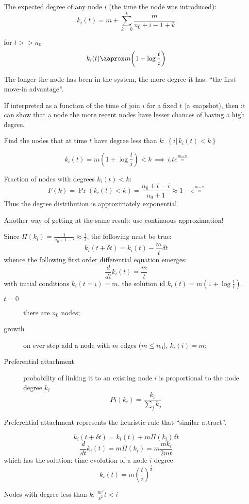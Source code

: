 \documentclass[a4paper]{article}
\newcommand{\obj}[1]{{\left\{ #1 \right \}}}
\newcommand{\brac}[1]{{\left ( #1 \right )}}
\newcommand{\induc}[1]{{\left . #1 \right \vert}}
\begin{document}
The expected degree of any node $i$ (the time the node was introduced):
\[k_i(t) = m + \sum_{k=0}^k\frac{m}{n_0+i-1 + k}\]

for $t>>n_0$
\[k_i(t) \aaprox m \brac{1 + \log\frac{t}{i}}\]

The longer the node has been in the system, the more degree it has: ``the first move-in advantage''.

If interpreted as a function of the time of join $i$ for a fixed $t$ (a snapshot), then it can show that a node the more recent nodes have lesser chances of having a high degree.


Find the nodes that at time $t$ have degree less than $k$: $\obj{\induc{i}\,k_i(t) < k}$

\[k_i(t) = m\brac{1+\log\frac{t}{i}}<k\,\implies\, i . t e^\frac{m-k}{m}\]

Fraction of nodes with degrees $k_i(t)<k$:
\[F(k) = \Pr\brac{k_i(t)<k} = \frac{n_0+t-i}{n_0+1} \approx 1 - e^\frac{m-k}{m}\]
Thus the degree distribution is approximately exponential.


Another way of getting at the same result: use continuous approximation!

Since $\Pi(k_i) = \frac{1}{n_0+t-i} \approx \frac{1}{t}$, the following must be true:
\[k_i(t+\delta t) = k_i(t) - \frac{m}{t}\delta t\]
whence the following first order differential equation emerges:
\[\frac{d}{dt}k_i(t) = \frac{m}{t}\]
with initial conditions $k_i(t=i) = m$.
the solution id $k_i(t) = m\brac{1+\log\frac{t}{i}}$.

\begin{description}
	\item[$t=0$] there are $n_0$ nodes;
	\item[growth] on ever step add a node with $m$ edges ($m\leq n_0$), $k_i(i)=m$;
	\item[Preferential attachment] probability of linking it to an existing node $i$ is proportional to the node degree $k_i$
	\[Pi(k_i) = \frac{k_i}{\sum_j k_j}\]
\end{description}

Preferential attachment represents the heuristic rule that ``similar attract''.

\[k_i(t+\delta t) = k_i(t) + m \Pi(k_i)\delta t\]
\[\frac{d}{dt}k_i(t) = m \Pi(k_i) = m \frac{m k_i}{2 m t}\]
which has the solution: time evolution of a node $i$ degree
\[k_i(t) = m\brac{\frac{t}{i}}^\tfrac{1}{2}\]

Nodes with degree less than $k$: $\frac{m^2}{k^2} t<i$
\end{document}
